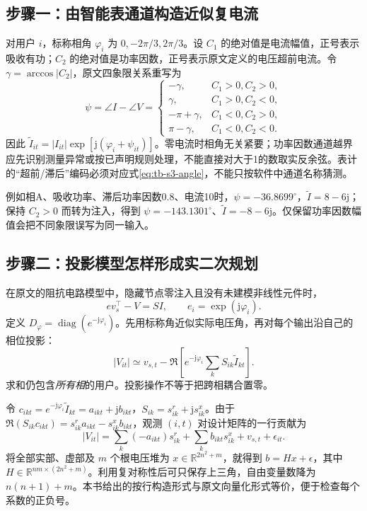 \documentclass[UTF8,11pt,fontset=fandol,openany,oneside]{ctexbook}
\newcommand{\R}{\mathbb{R}}
\DeclareMathOperator{\diag}{diag}
\theoremstyle{definition}
\theoremstyle{remark}
\numberwithin{equation}{chapter}
\begin{document}
\subsection{步骤一：由智能表通道构造近似复电流}
对用户 $i$，标称相角 $\varphi_i$ 为 $0,-2\pi/3,2\pi/3$。设 $C_1$ 的绝对值是电流幅值，正号表示吸收有功；$C_2$ 的绝对值是功率因数，正号表示原文定义的电压超前电流。令 $\gamma=\arccos|C_2|$，原文四象限关系重写为
\begin{equation}
 \psi=\angle I-\angle V=
 \begin{cases}
 -\gamma,&C_1>0,C_2>0,\\
 \gamma,&C_1>0,C_2<0,\\
 -\pi+\gamma,&C_1<0,C_2>0,\\
 \pi-\gamma,&C_1<0,C_2<0.
 \end{cases}\label{eq:tb-s3-angle}
\end{equation}
因此 $\widetilde I_{it}=|I_{it}|\exp[\mathrm j(\varphi_i+\psi_{it})]$。零电流时相角无关紧要；功率因数通道越界应先识别测量异常或按已声明规则处理，不能直接对大于1的数取实反余弦。表计的“超前/滞后”编码必须对应式\eqref{eq:tb-s3-angle}，不能只按软件中通道名称猜测。

例如相A、吸收功率、滞后功率因数0.8、电流10时，$\psi=-36.8699^\circ$，$\widetilde I=8-6\mathrm j$；保持 $C_2>0$ 而转为注入，得到 $\psi=-143.1301^\circ$、$\widetilde I=-8-6\mathrm j$。仅保留功率因数幅值会把不同象限误写为同一输入。

\subsection{步骤二：投影模型怎样形成实二次规划}
在原文的阻抗电路模型中，隐藏节点零注入且没有未建模非线性元件时，
\begin{equation}
 e v_s^\top-V=SI,\qquad e_i=\exp(\mathrm j\varphi_i).
\end{equation}
定义 $D_\varphi=\diag(e^{-\mathrm j\varphi_i})$。先用标称角近似实际电压角，再对每个输出沿自己的相位投影：
\begin{equation}
 |V_{it}|\simeq v_{s,t}
 -\Re\!\left[e^{-\mathrm j\varphi_i}\sum_kS_{ik}\widetilde I_{kt}\right].
 \label{eq:tb-s3-proj}
\end{equation}
求和仍包含\emph{所有相}的用户。投影操作不等于把跨相耦合置零。

令 $c_{ikt}=e^{-\mathrm j\varphi_i}\widetilde I_{kt}=a_{ikt}+\mathrm j b_{ikt}$，$S_{ik}=s^r_{ik}+\mathrm j s^x_{ik}$。由于
$\Re(S_{ik}c_{ikt})=s^r_{ik}a_{ikt}-s^x_{ik}b_{ikt}$，观测 $(i,t)$ 对设计矩阵的一行贡献为
\begin{equation}
 |V_{it}|=\sum_k(-a_{ikt})s^r_{ik}
 +\sum_k b_{ikt}s^x_{ik}+v_{s,t}+\epsilon_{it}.
 \label{eq:tb-s3-row}
\end{equation}
将全部实部、虚部及 $m$ 个根电压堆为 $x\in\R^{2n^2+m}$，就得到 $b=Hx+\epsilon$，其中 $H\in\R^{nm\times(2n^2+m)}$。利用复对称性后可只保存上三角，自由变量数降为 $n(n+1)+m$。本书给出的按行构造形式与原文向量化形式等价，便于检查每个系数的正负号。
\end{document}

